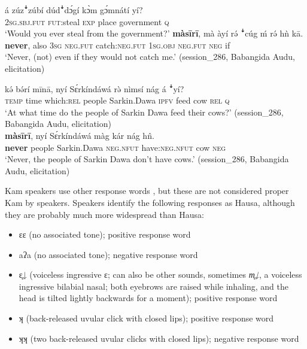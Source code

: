 \documentclass[output=paper,colorlinks,citecolor=brown]{langscibook}
\begin{document}
\ea\label{ex:kam:71}
    \begin{xlist}[Q: ]
    \label{ex:kam:71a}
        \gll á zúzꜜzúbí dúdꜜdɔ́gí kɔ̀m gɔ́mnátí yí? \\ 
             \textsc{2sg.sbj.fut} \textsc{fut}:steal \textsc{exp} place government \textsc{q} \\
        \glt ‘Would you ever steal from the government?’
    \label{ex:kam:71b}
        \gll \textbf{màsīrī}, mà àyí rə́ ꜜcúg ḿ rə́ hǹ kā. \\
             \textbf{never}, also 3\textsc{sg} \textsc{neg}.\textsc{fut} catch:\textsc{neg}.\textsc{fut} 1\textsc{sg}.\textsc{obj} \textsc{neg}.\textsc{fut} \textsc{neg} if \\
        \glt ‘Never, (not) even if they would not catch me.’ (session\_286, Babangida Audu, elicitation)\\
    \end{xlist}
\z 

\ea\label{ex:kam:72}
    \begin{xlist}[Q: ]
    \label{ex:kam:72a}
        \gll kə́ bə́rí mīnā, nyí Sɛ́rkíndáwá rə̀ nìmsí nág á ꜜyí? \\ 
             \textsc{temp} time which:\textsc{rel} people Sarkin.Dawa \textsc{ipfv} feed cow \textsc{rel} \textsc{q} \\
        \glt ‘At what time do the people of Sarkin Dawa feed their cows?’ (session\_286, Babangida Audu, elicitation)\\
    \label{ex:kam:72b}
        \gll \textbf{màsīrī}, nyí Sɛ́rkíndáwá màg kár nág h\^{n}. \\
            \textbf{never} people Sarkin.Dawa \textsc{neg}.\textsc{nfut} have:\textsc{neg}.\textsc{nfut} cow \textsc{neg}\\
        \glt ‘Never, the people of Sarkin Dawa don’t have cows.’ (session\_286, Babangida Audu, elicitation)
    \end{xlist}
\z 

Kam speakers use other response words , but these are not considered proper Kam by speakers. Speakers identify the following responses as Hausa, although they are probably much more widespread than Hausa:

\begin{itemize}
    \item ɛɛ (no associated tone); positive response word
    \item aʔa (no associated tone); negative response word
    \item ɛ̥↓ (voiceless ingressive ɛ; can also be other sounds, sometimes \textit{m̥↓}, a voiceless ingressive bilabial nasal; both eyebrows are raised while inhaling, and the head is tilted lightly backwards for a moment); positive response word
    \item ʞ (back-released uvular click with closed lips); positive response word \citep[cf.][]{Lionnet2020}
    \item ʞʞ (two back-released uvular clicks with closed lips); negative response word
\end{itemize}
\end{document}
